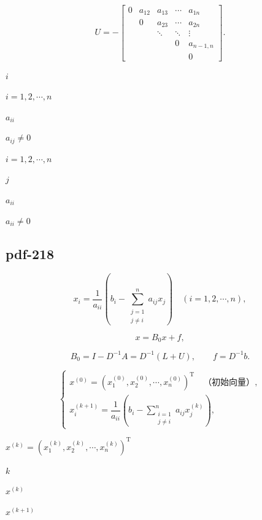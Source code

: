\documentclass[UTF8,fontset=fandol]{ctexart}
\begin{document}
\[
U=-\begin{bmatrix}
0&a_{12}&a_{13}&\cdots&a_{1n}\\
&0&a_{23}&\cdots&a_{2n}\\
&&\ddots&\ddots&\vdots\\
&&&0&a_{n-1,n}\\
&&&&0
\end{bmatrix}.
\]

$i$\par

$i=1,2,\cdots,n$\par

$a_{ii}$\par

$a_{ij}\neq0$\par

$i=1,2,\cdots,n$\par

$j$\par

$a_{ii}$\par

$a_{ii}\neq0$\par

\subsection*{pdf-218}

\[
x_i=\frac1{a_{ii}}\left(b_i-\sum_{\substack{j=1\\j\neq i}}^n a_{ij}x_j\right)\quad(i=1,2,\cdots,n),
\tag{8.2.2}
\]

\[
x=B_0x+f,
\]

\[
B_0=I-D^{-1}A=D^{-1}(L+U),\qquad f=D^{-1}b.
\]

\[
\begin{cases}
x^{(0)}=(x_1^{(0)},x_2^{(0)},\cdots,x_n^{(0)})^{\mathrm T}\quad\text{（初始向量）},\\[4pt]
x_i^{(k+1)}=\dfrac1{a_{ii}}\left(b_i-\displaystyle\sum_{\substack{i=1\\j\neq i}}^n a_{ij}x_j^{(k)}\right),
\end{cases}
\tag{8.2.3}
\]

$x^{(k)}=(x_1^{(k)},x_2^{(k)},\cdots,x_n^{(k)})^{\mathrm T}$\par

$k$\par

$x^{(k)}$\par

$x^{(k+1)}$\par
\end{document}
